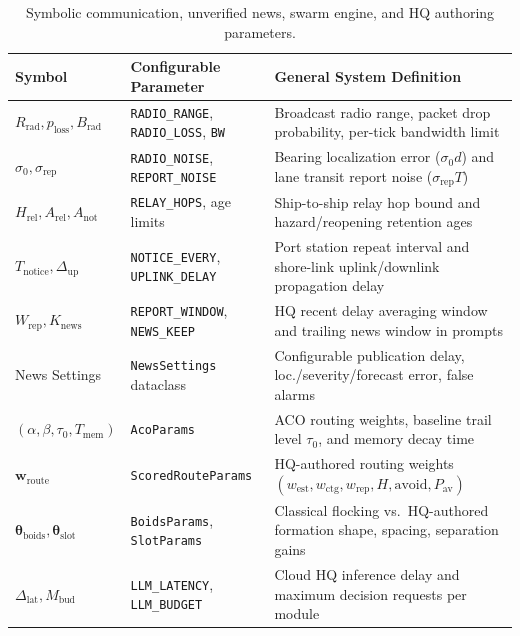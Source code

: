 \documentclass[11pt,a4paper,oneside]{report}
\begin{document}
\begin{table}[H]
\centering
\caption[Symbolic communication and control notations]{Symbolic communication, unverified news, swarm engine, and HQ authoring parameters.}
\label{tab:notations-ctrl}
\begin{tabularx}{\textwidth}{@{}ll>{\raggedright\arraybackslash}X@{}}
\toprule
\textbf{Symbol} & \textbf{Configurable Parameter} & \textbf{General System Definition} \\
\midrule
$R_{\text{rad}}, p_{\text{loss}}, B_{\text{rad}}$ & \texttt{RADIO\_RANGE}, \texttt{RADIO\_LOSS}, \texttt{BW} & Broadcast radio range, packet drop probability, per-tick bandwidth limit \\
$\sigma_0, \sigma_{\text{rep}}$ & \texttt{RADIO\_NOISE}, \texttt{REPORT\_NOISE} & Bearing localization error ($\sigma_0 d$) and lane transit report noise ($\sigma_{\text{rep}} T$) \\
$H_{\text{rel}}, A_{\text{rel}}, A_{\text{not}}$ & \texttt{RELAY\_HOPS}, age limits & Ship-to-ship relay hop bound and hazard/reopening retention ages \\
$T_{\text{notice}}, \Delta_{\text{up}}$ & \texttt{NOTICE\_EVERY}, \texttt{UPLINK\_DELAY} & Port station repeat interval and shore-link uplink/downlink propagation delay \\
$W_{\text{rep}}, K_{\text{news}}$ & \texttt{REPORT\_WINDOW}, \texttt{NEWS\_KEEP} & HQ recent delay averaging window and trailing news window in prompts \\
News Settings & \texttt{NewsSettings} dataclass & Configurable publication delay, loc./severity/forecast error, false alarms \\
$(\alpha, \beta, \tau_0, T_{\text{mem}})$ & \texttt{AcoParams} & ACO routing weights, baseline trail level $\tau_0$, and memory decay time \\
$\mathbf{w}_{\text{route}}$ & \texttt{ScoredRouteParams} & HQ-authored routing weights $(w_{\text{est}}, w_{\text{ctg}}, w_{\text{rep}}, H, \text{avoid}, P_{\text{av}})$ \\
$\boldsymbol{\theta}_{\text{boids}}, \boldsymbol{\theta}_{\text{slot}}$ & \texttt{BoidsParams}, \texttt{SlotParams} & Classical flocking vs.\ HQ-authored formation shape, spacing, separation gains \\
$\Delta_{\text{lat}}, M_{\text{bud}}$ & \texttt{LLM\_LATENCY}, \texttt{LLM\_BUDGET} & Cloud HQ inference delay and maximum decision requests per module \\
\bottomrule
\end{tabularx}
\end{table}
\end{document}

